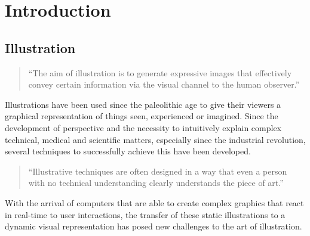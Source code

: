\chapter{Introduction}
\section{Illustration}
\begin{quote}
``The aim of illustration is to generate expressive images that effectively convey certain information via the visual channel to the human observer.'' \cite{Viola:2005:SVV:2381219.2381249}
\end{quote}

Illustrations have been used since the paleolithic age\cite{Viola:2005:SVV:2381219.2381249} to give their viewers a graphical representation of things seen, experienced or imagined. Since the development of perspective and the necessity to intuitively explain complex technical, medical and scientific matters, especially since the industrial revolution, several techniques to successfully achieve this have been developed.
\begin{quote}
``Illustrative techniques are often designed in a way that even a person with no technical understanding clearly understands the piece of art.'' \cite{Viola:2005:SVV:2381219.2381249}
\end{quote}
With the arrival of computers that are able to create complex graphics that react in real-time to user interactions, the transfer of these static illustrations to a dynamic visual representation has posed new challenges to the art of illustration.\\

